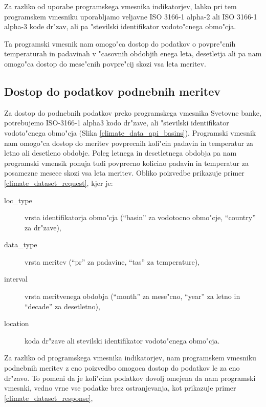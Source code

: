 Za razliko od uporabe programskega vmesnika indikatorjev, lahko pri tem
programskem vmesniku uporabljamo veljavne ISO 3166-1 alpha-2 ali ISO 3166-1 
alpha-3 kode dr"zav, ali pa "stevilski identifikator vodoto"cnega 
obmo"cja.

Ta programski vmesnik nam omogo"ca dostop do podatkov o povpre"cnih 
temperaturah in padavinah v "casovnih obdobjih enega leta, desetletja ali pa 
nam omogo"ca dostop do mese"cnih povpre"cij skozi vsa leta meritev.


\subsection{Dostop do podatkov podnebnih meritev}

Za dostop do podnebnih podatkov preko programskega vmesnika Svetovne banke,
potrebujemo ISO-3166-1 alpha3 kodo dr"zave, ali "stevilski identifikator
vodoto"cnega obmo"cja (Slika \ref{climate_data_api_basins}). Programski vmesnik
nam omogo"ca dostop do meritev povprecnih koli"cin padavin in temperatur za 
letno ali desetleno obdobje. Poleg letnega in desetletnega obdobja pa nam 
programski vmensik ponuja tudi povprecno kolicino padavin in temperatur za 
posamezne mesece skozi vsa leta meritev. Obliko poizvedbe prikazuje primer 
\ref{climate_dataset_request}, kjer je:
\begin{description}
\item [loc\_type] vrsta identifikatorja obmo"cja (``basin'' za vodotocno obmo"cje, 
  ``country'' za dr"zave),
\item [data\_type] vrsta meritev (``pr'' za padavine, ``tas'' za temperature),
\item [interval] vrsta meritvenega obdobja (``month'' za mese"cno, ``year'' za letno in
  ``decade'' za desetletno),
\item [location] koda dr"zave ali stevilski identifikator vodoto"cnega obmo"cja.
\end{description}
Za razliko od programskega vmesnika indikatorjev, nam programskem vmesniku
podnebnih meritev z eno poizvedbo omogoca dostop do podatkov le za eno dr"zavo.
To pomeni da je koli"cina podatkov dovolj omejena da nam programski vmesnki,
vedno vrne vse podatke brez ostranjevanja, kot prikazuje primer 
\ref{climate_dataset_response},


